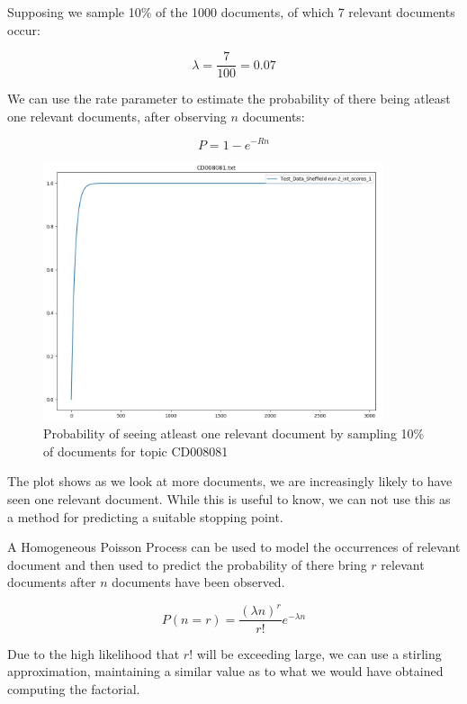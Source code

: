 Supposing we sample 10\% of the 1000 documents, of which 7 relevant documents occur:

\begin{equation}
	  \lambda = \frac{7}{100} = 0.07
\end{equation}

We can use the rate parameter to estimate the probability of there being atleast one relevant documents, after observing $n$ documents:

\begin{equation}
	  P = 1 - e ^ {-Rn}
\end{equation}


\begin{figure}[H]
\center
\includegraphics[width=10cm]{figures/probOneDoc.jpg}
\caption{Probability of seeing atleast one relevant document by sampling 10\% of documents for topic CD008081}
\end{figure}

The plot shows as we look at more documents, we are increasingly likely to have seen one relevant document. While this is useful to know, we can not use this as a method for predicting a suitable stopping point.

A Homogeneous Poisson Process can be used to model the occurrences of relevant document and then used to predict the probability of there bring $r$ relevant documents after $n$ documents have been observed. 

\begin{equation}
	  P(n = r) = \frac{(\lambda n)^r}{r!} e ^ {-\lambda n}
\end{equation}


Due to the high likelihood that $r!$ will be exceeding large, we can use a stirling approximation, maintaining a similar value as to what we would have obtained computing the factorial.


